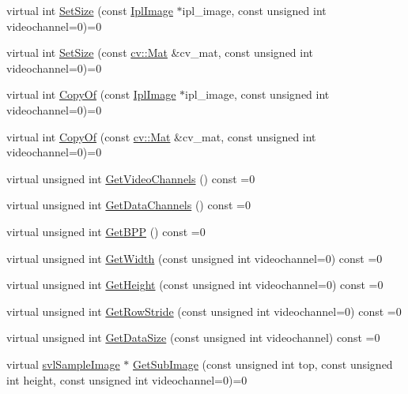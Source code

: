 \begin{DoxyCompactItemize}
virtual int \hyperlink{classsvl_sample_image_a17e6ad84e31a3c4848773c01a6c811c2}{Set\-Size} (const \hyperlink{svl_types_8h_aa5a40a13021ba9708bfe921e18fdfa53}{Ipl\-Image} $\ast$ipl\-\_\-image, const unsigned int videochannel=0)=0
\item 
virtual int \hyperlink{classsvl_sample_image_a57255ee3dc0fd9509f9aa22eb5c85fa4}{Set\-Size} (const \hyperlink{namespacecv_a60d81b54f4914bec4cc4a72ab77eb444}{cv\-::\-Mat} \&cv\-\_\-mat, const unsigned int videochannel=0)=0
\item 
virtual int \hyperlink{classsvl_sample_image_ad39690ff5f70bcf7a7dc632be9760656}{Copy\-Of} (const \hyperlink{svl_types_8h_aa5a40a13021ba9708bfe921e18fdfa53}{Ipl\-Image} $\ast$ipl\-\_\-image, const unsigned int videochannel=0)=0
\item 
virtual int \hyperlink{classsvl_sample_image_a97a0bece9ac692866587712372a8b162}{Copy\-Of} (const \hyperlink{namespacecv_a60d81b54f4914bec4cc4a72ab77eb444}{cv\-::\-Mat} \&cv\-\_\-mat, const unsigned int videochannel=0)=0
\item 
virtual unsigned int \hyperlink{classsvl_sample_image_a50d7ca3459272a2dd7b7ee68dabd6e54}{Get\-Video\-Channels} () const =0
\item 
virtual unsigned int \hyperlink{classsvl_sample_image_a473f2373ddcc8db26f7770e9a093801f}{Get\-Data\-Channels} () const =0
\item 
virtual unsigned int \hyperlink{classsvl_sample_image_a4202b640e742ec266078b00a9b8afa0e}{Get\-B\-P\-P} () const =0
\item 
virtual unsigned int \hyperlink{classsvl_sample_image_a93493be70fead7b2020810512129e45f}{Get\-Width} (const unsigned int videochannel=0) const =0
\item 
virtual unsigned int \hyperlink{classsvl_sample_image_ae9b31054c61c8aa90fd57753bf573456}{Get\-Height} (const unsigned int videochannel=0) const =0
\item 
virtual unsigned int \hyperlink{classsvl_sample_image_a48bd873cc1b46bf5f18157451b7f8fdd}{Get\-Row\-Stride} (const unsigned int videochannel=0) const =0
\item 
virtual unsigned int \hyperlink{classsvl_sample_image_a9b5b050e77a24299d0f08fcfefe6599d}{Get\-Data\-Size} (const unsigned int videochannel) const =0
\item 
virtual \hyperlink{classsvl_sample_image}{svl\-Sample\-Image} $\ast$ \hyperlink{classsvl_sample_image_a1fc3d0662cfd58ae96ab4a3b1724d690}{Get\-Sub\-Image} (const unsigned int top, const unsigned int height, const unsigned int videochannel=0)=0

\end{DoxyCompactItemize}
